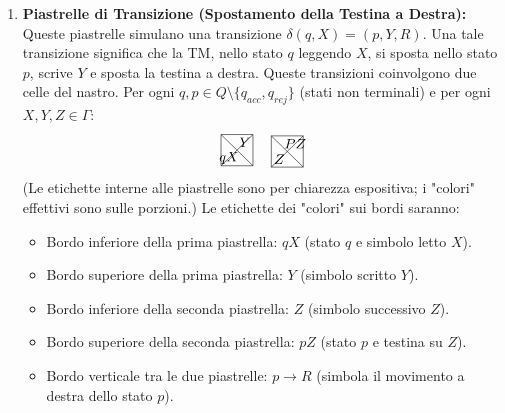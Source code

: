 \documentclass[a4paper]{article}
\begin{document}
\begin{enumerate}
    \item \textbf{Piastrelle di Transizione (Spostamento della Testina a Destra):}
    Queste piastrelle simulano una transizione $\delta(q, X) = (p, Y, R)$. Una tale transizione significa che la TM, nello stato $q$ leggendo $X$, si sposta nello stato $p$, scrive $Y$ e sposta la testina a destra.
    Queste transizioni coinvolgono due celle del nastro.
    Per ogni $q, p \in Q \setminus \{q_{acc}, q_{rej}\}$ (stati non terminali) e per ogni $X, Y, Z \in \Gamma$:
    \[
    \begin{tikzpicture}[scale=0.8]
    \draw (0,0) -- (1,0) -- (1,1) -- (0,1) -- cycle;
    \draw (0,0) -- (1,1);
    \draw (1,0) -- (0,1);
    \node at (0.25, 0.75) {}; %
    \node at (0.75, 0.75) {$Y$}; %
    \node at (0.25, 0.25) {$qX$}; %
    \node at (0.75, 0.25) {}; %
    \end{tikzpicture}
    \quad
    \begin{tikzpicture}[scale=0.8]
    \draw (0,0) -- (1,0) -- (1,1) -- (0,1) -- cycle;
    \draw (0,0) -- (1,1);
    \draw (1,0) -- (0,1);
    \node at (0.25, 0.75) {}; %
    \node at (0.75, 0.75) {$PZ$}; %
    \node at (0.25, 0.25) {$Z$}; %
    \node at (0.75, 0.25) {}; %
    \end{tikzpicture}
    \]
    (Le etichette interne alle piastrelle sono per chiarezza espositiva; i "colori" effettivi sono sulle porzioni.)
    Le etichette dei "colori" sui bordi saranno:
    \begin{itemize}
        \item Bordo inferiore della prima piastrella: $qX$ (stato $q$ e simbolo letto $X$).
        \item Bordo superiore della prima piastrella: $Y$ (simbolo scritto $Y$).
        \item Bordo inferiore della seconda piastrella: $Z$ (simbolo successivo $Z$).
        \item Bordo superiore della seconda piastrella: $pZ$ (stato $p$ e testina su $Z$).
        \item Bordo verticale tra le due piastrelle: $p \to R$ (simbola il movimento a destra dello stato $p$).
    \end{itemize}


\end{enumerate}
\end{document}
